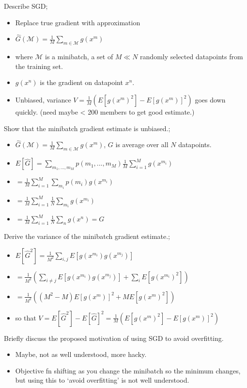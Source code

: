 \documentclass{article}
\begin{document}
Describe SGD; \begin{itemize}
	\item Replace true gradient with approximation 
	\item $\hat{G}(\mathcal{M}) = \frac{1}{M}\sum_{m\in\mathcal{M}} g(x^m)$
	\item where $\mathcal{M}$ is a minibatch, a set of $M\ll N$ randomly selected datapoints from the training set.
	\item $g(x^n)$ is the gradient on datapoint $x^n$.
	\item Unbiased, variance $V=\frac{1}{M}(E[g(x^m)^2]-E[g(x^m)]^2)$ goes down quickly. (need maybe < 200 members to get good estimate.)
\end{itemize}

Show that the minibatch gradient estimate is unbiased.; \begin{itemize}
	\item $\hat{G}(\mathcal{M}) = \frac{1}{M}\sum_{m\in\mathcal{M}} g(x^m)$, $G$ is average over all $N$ datapoints.
	\item $E[\hat{G}] = \sum_{m_1,...,m_M} p(m_1,...,m_M)\frac{1}{M}\sum_{i=1}^M g(x^{m_i})$
	\item $= \frac{1}{M}\sum_{i=1}^M\sum_{m_i} p(m_i)g(x^{m_i})$
	\item $=\frac{1}{M}\sum_{i=1}^M\frac{1}{N}\sum_{m_i}g(x^{m_i})$
	\item $=\frac{1}{M}\sum_{i=1}^M\frac{1}{N}\sum_{n}g(x^{n})=G$
\end{itemize}

Derive the variance of the minibatch gradient estimate.; \begin{itemize}
	\item $E[\hat{G}^2] = \frac{1}{M^2}\sum_{i,j}E[g(x^{m_i})g(x^{m_j})]$
	\item $=\frac{1}{M^2}(\sum_{i\ne j}E[g(x^{m_i})g(x^{m_j})]+\sum_i E[g(x^{m_i})^2])$
	\item $=\frac{1}{M^2}((M^2-M)E[g(x^{m})]^2 + M E[g(x^{m})^2])$
	\item so that $V=E[\hat{G}^2]-E[\hat{G}]^2 = \frac{1}{M}(E[g(x^{m})^2]- E[g(x^{m})]^2)$
\end{itemize}

Briefly discuss the proposed motivation of using SGD to avoid overfitting. \begin{itemize}
	\item Maybe, not as well understood, more hacky.
	\item Objective fn shifting as you change the minibatch so the minimum changes, but using this to `avoid overfitting' is not well understood.
\end{itemize}
\end{document}
